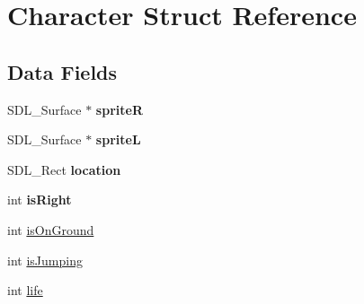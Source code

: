 \hypertarget{struct_character}{\section{Character Struct Reference}
\label{struct_character}
}
\subsection*{Data Fields}
\begin{DoxyCompactItemize}
\item 
\hypertarget{struct_character_a4186e172249b67c908a4439f239c1de9}{S\-D\-L\-\_\-\-Surface $\ast$ {\bfseries sprite\-R}}\label{struct_character_a4186e172249b67c908a4439f239c1de9}

\item 
\hypertarget{struct_character_a73edf76e7b33bc324df0c1a576bf20ab}{S\-D\-L\-\_\-\-Surface $\ast$ {\bfseries sprite\-L}}\label{struct_character_a73edf76e7b33bc324df0c1a576bf20ab}

\item 
\hypertarget{struct_character_a08e7ab1c2395b84bea7ca13eb99bac60}{S\-D\-L\-\_\-\-Rect {\bfseries location}}\label{struct_character_a08e7ab1c2395b84bea7ca13eb99bac60}

\item 
\hypertarget{struct_character_ac73a92163fd55152d03d0aaca5093b72}{int {\bfseries is\-Right}}\label{struct_character_ac73a92163fd55152d03d0aaca5093b72}

\item 
int \hyperlink{struct_character_aa4061d19d285d0ef281f333dee8f9a00}{is\-On\-Ground}
\item 
int \hyperlink{struct_character_a6a61db42178df20e0afd7a5b65412735}{is\-Jumping}
\item 
int \hyperlink{struct_character_adf488ff0ce8098cd956c07890cbc5d50}{life}
\end{DoxyCompactItemize}


